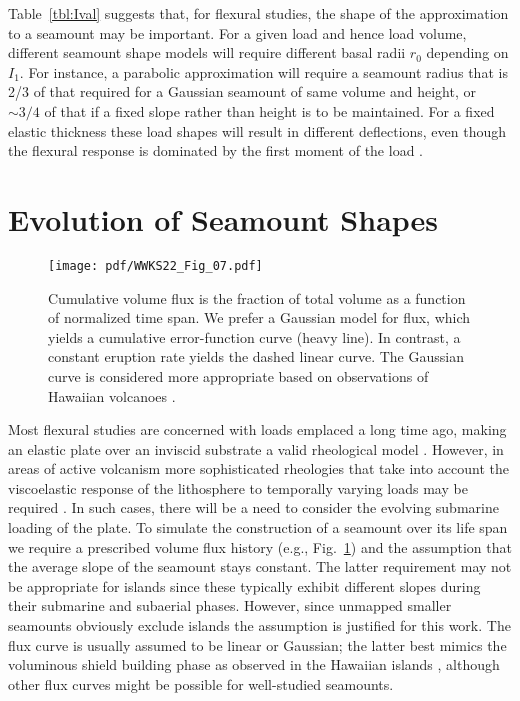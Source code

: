Table~\ref{tbl:Ival} suggests that, for flexural studies, the shape of the approximation to a seamount may be important.
For a given load and hence load volume, different seamount shape models will require different basal radii
$r_0$ depending on $I_1$.  For instance, a parabolic approximation will require a seamount radius that is 2/3
of that required for a Gaussian seamount of same volume and height, or $\sim 3/4$ of that if a fixed slope rather
than height is to be maintained. For a fixed elastic thickness these load shapes will result in different deflections,
even though the flexural response is dominated by the first moment of the load \citep{M1981}.

\section{Evolution of Seamount Shapes}
\label{sec:evol}
\begin{figure}
\centering
\texttt{[image: pdf/WWKS22\_Fig\_07.pdf]}
\caption{Cumulative volume flux is the fraction of total volume as a function of normalized time span.
We prefer a Gaussian model for flux, which yields a cumulative error-function curve (heavy line). In contrast,
a constant eruption rate yields the dashed linear curve.
The Gaussian curve is considered more appropriate based on observations of Hawaiian volcanoes \citep{DS1996}.}
\label{WWKS22_Fig_07}
\end{figure}
Most flexural studies are concerned with loads emplaced a long time ago, making an elastic plate over an inviscid substrate
a valid rheological model \citep[e.g.,~][]{WC74}.  However, in areas of active volcanism more sophisticated rheologies that take into
account the viscoelastic response of the lithosphere to temporally varying loads may be required \citep[e.g.,~][]{ZW2013}.
In such cases, there will be a need to consider the evolving submarine loading of the plate. To simulate the construction
of a seamount over its life span we require a prescribed volume flux history (e.g., Fig.~\ref{WWKS22_Fig_07})
and the assumption that the average slope of the seamount stays constant.  The latter requirement may not be
appropriate for islands since these typically exhibit different slopes during their submarine and subaerial
phases.  However, since unmapped smaller seamounts obviously exclude islands the assumption is justified for this
work. The flux curve is usually assumed to be linear or Gaussian; the latter best mimics the voluminous shield
building phase as observed in the Hawaiian islands \citep{DS1996}, although other flux curves might be possible
for well-studied seamounts.

